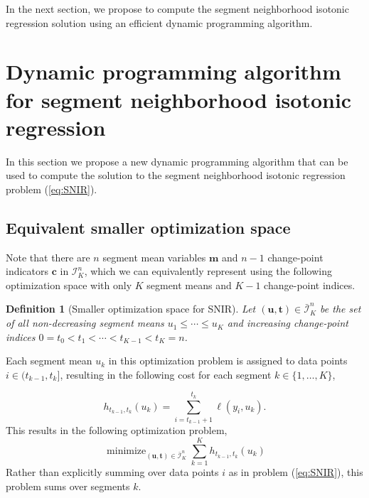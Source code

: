 \documentclass{article}
\newtheorem{definition}{Definition}
\DeclareMathOperator*{\minimize}{minimize}
\begin{document}
In the next section, we propose to compute the segment neighborhood
isotonic regression solution using an efficient dynamic programming
algorithm.

\newcommand{\FCC}{C}
\newcommand{\M}{\mathcal{M}}
\section{Dynamic programming algorithm for segment neighborhood isotonic regression}
\label{sec:algorithms}


In this section we propose a new dynamic programming algorithm that
can be used to compute the solution to the segment neighborhood
isotonic regression problem (\ref{eq:SNIR}). 

\subsection{Equivalent smaller optimization space}

Note that there are $n$
segment mean variables $\mathbf m$ and $n-1$ change-point indicators
$\mathbf c$ in $\mathcal I_K^n$, which we can equivalently represent
using the following optimization space with only $K$ segment means and
$K-1$ change-point indices.

\begin{definition}[Smaller optimization space for SNIR]
\label{def:Ibar}
  Let $(\mathbf u, \mathbf t)\in\bar{\mathcal I}^n_K$ be the set of
  all non-decreasing segment means $u_1\leq\cdots\leq u_K$ and
  increasing change-point indices $0=t_0<t_1<\cdots<t_{K-1}<t_K=n$.
\end{definition}

Each segment mean $u_k$ in this optimization problem is assigned to
data points $i\in(t_{k-1},t_k]$, resulting in the following cost
for each segment $k\in\{1, \dots, K\}$,

\begin{equation}
  \label{eq:h}
  h_{t_{k-1}, t_k}(u_k) = \sum_{i=t_{k-1}+1}^{t_k} \ell(y_i, u_k).
\end{equation}
This results in the following optimization problem,
\begin{equation}
  \label{eq:isotonic_ut}
  \minimize_{(\mathbf u, \mathbf t)\in\bar{\mathcal I}^n_K}
  \sum_{k=1}^K
  h_{t_{k-1}, t_k}(u_k)
\end{equation}
Rather than explicitly summing over data points $i$ as in problem
(\ref{eq:SNIR}), this problem sums over segments $k$. 
\end{document}
